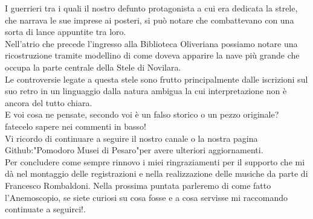 \documentclass[hidelinks,12pt,a4paper]{article}
\begin{document}
\begin{flushleft}
		I guerrieri tra i quali il nostro defunto protagonista a cui era dedicata la strele, che narrava le sue imprese ai posteri, si può notare che combattevano con una sorta di lance appuntite tra loro.\\
		Nell'atrio che precede l'ingresso alla Biblioteca Oliveriana possiamo notare una ricostruzione tramite modellino di come doveva apparire la nave più grande che occupa la parte centrale della Stele di Novilara.\\ 
		Le controversie legate a questa stele sono frutto principalmente dalle iscrizioni sul suo retro in un linguaggio dalla natura ambigua la cui interpretazione non è ancora del tutto chiara.\\
		E voi cosa ne pensate, secondo voi è un falso storico o un pezzo originale? fatecelo sapere  nei commenti in basso!\\
		Vi ricordo di continuare a seguire il nostro canale o la nostra pagina Github:"Pomodoro Musei di Pesaro"per avere ulteriori aggiornamenti.\\
		Per concludere come sempre rinnovo i miei ringraziamenti per il supporto che mi dà nel montaggio delle registrazioni e nella realizzazione delle musiche da parte di Francesco Rombaldoni. Nella prossima puntata parleremo di come fatto l'Anemoscopio, se siete curiosi su cosa fosse e a cosa servisse mi raccomando continuate a seguirci!.\\
		

\end{flushleft}
\end{document}
